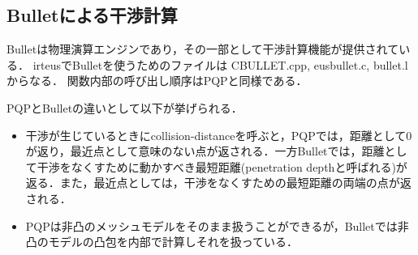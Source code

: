

\subsection{Bulletによる干渉計算}

Bulletは物理演算エンジンであり，その一部として干渉計算機能が提供されている．
irteusでBulletを使うためのファイルは
CBULLET.cpp, eusbullet.c, bullet.l
からなる．
関数内部の呼び出し順序はPQPと同様である．

PQPとBulletの違いとして以下が挙げられる．
\begin{itemize}
  \item 干渉が生じているときにcollision-distanceを呼ぶと，PQPでは，距離として0が返り，最近点として意味のない点が返される．一方Bulletでは，距離として干渉をなくすために動かすべき最短距離(penetration depthと呼ばれる)が返る．また，最近点としては，干渉をなくすための最短距離の両端の点が返される．
  \item PQPは非凸のメッシュモデルをそのまま扱うことができるが，Bulletでは非凸のモデルの凸包を内部で計算しそれを扱っている．
\end{itemize}


